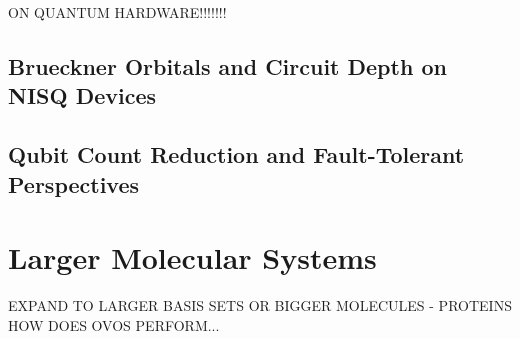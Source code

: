 ON QUANTUM HARDWARE!!!!!!!

\subsection{Brueckner Orbitals and Circuit Depth on NISQ Devices}
\label{sec:outlook_brueckner_nisq}

\subsection{Qubit Count Reduction and Fault-Tolerant Perspectives}

\section{Larger Molecular Systems}
%
%

EXPAND TO LARGER BASIS SETS OR BIGGER MOLECULES - PROTEINS HOW DOES OVOS PERFORM...

